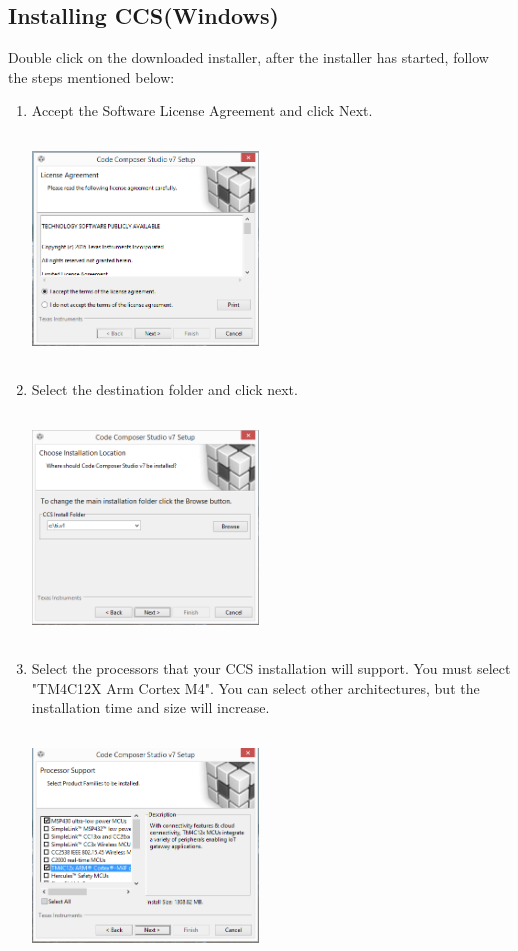\documentclass[a4paper,12pt,oneside]{book}
\begin{document}
\subsection{Installing CCS(Windows)}
Double click on the downloaded installer, after the installer has started, follow the steps mentioned below:\\
\begin{enumerate}
\item Accept the Software License Agreement and click Next.\\
{\begin{center}
\includegraphics[width=6cm, height=6cm]{MiscImages/CCSInstall1}
\end{center}}
\item Select the destination folder and click next.\\
\begin{center}
\includegraphics[width=6cm, height=6cm]{MiscImages/CCSInstall2}
\end{center}
\item Select the processors that your CCS installation will support. You must select "TM4C12X Arm Cortex M4". You can select other architectures, but the installation time and size will increase.\\
\begin{center}
\includegraphics[width=6cm, height=6cm]{MiscImages/CCSInstall3}

\end{center}
\end{enumerate}
\end{document}
